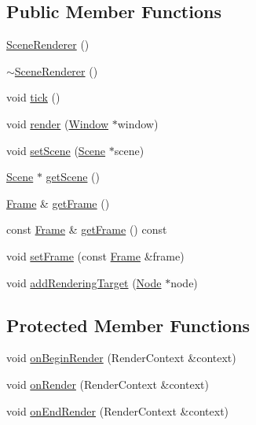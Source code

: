 \subsection*{Public Member Functions}
\begin{DoxyCompactItemize}
\item 
\mbox{\hyperlink{classec_1_1_scene_renderer_a7759ceff361e2d9b90ffe35ee61dc8c2}{Scene\+Renderer}} ()
\item 
\mbox{\hyperlink{classec_1_1_scene_renderer_ae8350e90e64b53e3dfb121c11a9d3283}{$\sim$\+Scene\+Renderer}} ()
\item 
void \mbox{\hyperlink{classec_1_1_scene_renderer_a62a39c6b1097757c9757c17506a8b2b0}{tick}} ()
\item 
void \mbox{\hyperlink{classec_1_1_scene_renderer_aa8cdd59972fd7dc7ce7c65e69c4a358b}{render}} (\mbox{\hyperlink{classec_1_1_window}{Window}} $\ast$window)
\item 
void \mbox{\hyperlink{classec_1_1_scene_renderer_a820900867a7c2b765eea61c6014aaee2}{set\+Scene}} (\mbox{\hyperlink{classec_1_1_scene}{Scene}} $\ast$scene)
\item 
\mbox{\hyperlink{classec_1_1_scene}{Scene}} $\ast$ \mbox{\hyperlink{classec_1_1_scene_renderer_abebdf008a71d9d51f550db87db92044d}{get\+Scene}} ()
\item 
\mbox{\hyperlink{classec_1_1_frame}{Frame}} \& \mbox{\hyperlink{classec_1_1_scene_renderer_a5e314c4d0e216f80e38d72792b0f81b1}{get\+Frame}} ()
\item 
const \mbox{\hyperlink{classec_1_1_frame}{Frame}} \& \mbox{\hyperlink{classec_1_1_scene_renderer_a8d40b598152f261d0fb3bcfa829e26e9}{get\+Frame}} () const
\item 
void \mbox{\hyperlink{classec_1_1_scene_renderer_a3981f0af87cf5b190b4dd5b0aa694472}{set\+Frame}} (const \mbox{\hyperlink{classec_1_1_frame}{Frame}} \&frame)
\item 
void \mbox{\hyperlink{classec_1_1_scene_renderer_a2d6d678c8e8cd9c068312a951cf8f33c}{add\+Rendering\+Target}} (\mbox{\hyperlink{classec_1_1_node}{Node}} $\ast$node)
\end{DoxyCompactItemize}
\subsection*{Protected Member Functions}
\begin{DoxyCompactItemize}
\item 
void \mbox{\hyperlink{classec_1_1_scene_renderer_ad1d418d6caa7ada328ae9648663c2d23}{on\+Begin\+Render}} (Render\+Context \&context)
\item 
void \mbox{\hyperlink{classec_1_1_scene_renderer_a3d57e498fde970f039783f7ee8b015fc}{on\+Render}} (Render\+Context \&context)
\item 
void \mbox{\hyperlink{classec_1_1_scene_renderer_ae4c7c5bfe81b36ab18e36c2ea75ea53b}{on\+End\+Render}} (Render\+Context \&context)
\end{DoxyCompactItemize}


